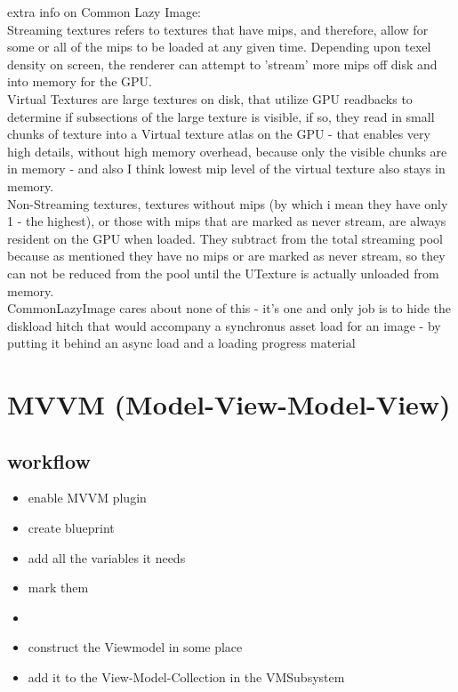             extra info on Common Lazy Image: \\
            Streaming textures refers to textures that have mips, and therefore, allow for some or all of the mips to be loaded at any given time.  Depending upon texel density on screen, the renderer can attempt to 'stream' more mips off disk and into memory for the GPU.
            \\
            Virtual Textures are large textures on disk, that utilize GPU readbacks to determine if subsections of the large texture is visible, if so, they read in small chunks of texture into a Virtual texture atlas on the GPU - that enables very high details, without high memory overhead, because only the visible chunks are in memory - and also I think lowest mip level of the virtual texture also stays in memory.
            \\
            Non-Streaming textures, textures without mips (by which i mean they have only 1 - the highest), or those with mips that are marked as never stream, are always resident on the GPU when loaded.  They subtract from the total streaming pool because as mentioned they have no mips or are marked as never stream, so they can not be reduced from the pool until the UTexture is actually unloaded from memory.
            \\
            CommonLazyImage cares about none of this - it's one and only job is to hide the diskload hitch that would accompany a synchronus asset load for an image - by putting it behind an async load and a loading progress material


            
    \section{MVVM (Model-View-Model-View)}
        \subsection{workflow}
        \begin{itemize}
            \item enable MVVM plugin
            \item create blueprint 
            \item add all the variables it needs
            \item mark them 
            \item 
            \item construct the Viewmodel in some place 
            \item add it to the View-Model-Collection in the VMSubsystem 
        \end{itemize}
            
